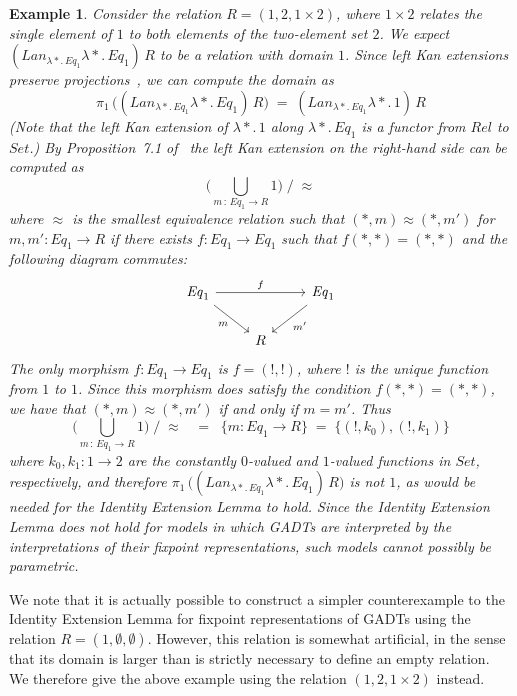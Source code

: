 \documentclass[submission,copyright,creativecommons]{eptcs}
\newtheorem{example}[thm]{Example}
\begin{document}
\begin{example}
Consider the relation $R = (1, 2, 1 \times 2)$, where $1 \times 2$
relates the single element of $1$ to both elements of the two-element
set $2$. We expect $(\mathit{Lan}_{\lambda *\!.\,\mathit{Eq}_1}
\lambda *\!.\,\mathit{Eq}_1)\, R$ to be a relation with domain
$1$. Since left Kan extensions preserve projections~\cite{rie16}, we
can compute the domain as
\[\pi_1\,\big( (\mathit{Lan}_{\lambda *\!.\,\mathit{Eq}_1} \lambda
*\!.\,\mathit{Eq}_1) \, R \big)\;=\; (\mathit{Lan}_{\lambda
 *\!.\,\mathit{Eq}_1} \lambda *\!. \,1)\, R\] (Note that the left Kan
 extension of $\lambda *\!. \,1$ along $\lambda *\!.\,\mathit{Eq}_1$
 is a functor from $\mathit{Rel}$ to $\mathit{Set}$.) By
 Proposition~7.1 of~\cite{blw03} the left Kan extension on the
 right-hand side can be computed as
\[ \big( \bigcup_{m\, :\, \mathit{Eq}_1 \to R} 1 \big) \; /\; \approx\]
where $\approx$ is the smallest equivalence relation such that $(\ast,
m) \approx (\ast, m')$ for $m, m' : \mathit{Eq}_1 \to R$ if there
exists $f : \mathit{Eq}_1 \to \mathit{Eq}_1$ such that $f (\ast, \ast)
= (\ast, \ast)$ and the following diagram commutes:
\[
\begin{tikzcd}
\mathit{Eq}_1 \ar[rr, "{f}"] \ar[dr, "m"']
&&\mathit{Eq}_1 \ar[dl, "m'"] \\
&R
\end{tikzcd}
\]
The only morphism $f : \mathit{Eq}_1 \to \mathit{Eq}_1$ is $f = (!,
!)$, where $!$ is the unique function from $1$ to $1$.  Since this
morphism does satisfy the condition $f (\ast, \ast) = (\ast, \ast)$,
we have that $(\ast, m) \approx (\ast, m')$ if and only if $m =
m'$. Thus
\[ \big( \bigcup_{m\, :\,
  \mathit{Eq}_1 \to R} 1 \big) \; /\; \approx \;\;\; = \;\; \{m :
\mathit{Eq}_1 \to R\} \;=\; \{(!, k_0), (!, k_1)\}\] where $k_0, k_1 :
1 \to 2$ are the constantly $0$-valued and $1$-valued functions in
$\mathit{Set}$, respectively, and therefore $\pi_1\,\big(
(\mathit{Lan}_{\lambda *\!.\,\mathit{Eq}_1} \lambda
*\!.\,\mathit{Eq}_1) \, R \big)$ is not $1$, as would be needed for
the Identity Extension Lemma to hold.  Since the Identity Extension
Lemma does not hold for models in which GADTs are interpreted by the
interpretations of their fixpoint representations, such models cannot
possibly be parametric.
\end{example}

\vspace*{-0.05in}

We note that it is actually possible to construct a simpler
counterexample to the Identity Extension Lemma for fixpoint
representations of GADTs using the relation $R = (1,\emptyset,
\emptyset)$. However, this relation is somewhat artificial, in the
sense that its domain is larger than is strictly necessary to define
an empty relation. We therefore give the above example using the
relation $(1,2,1 \times 2)$ instead.
\end{document}

